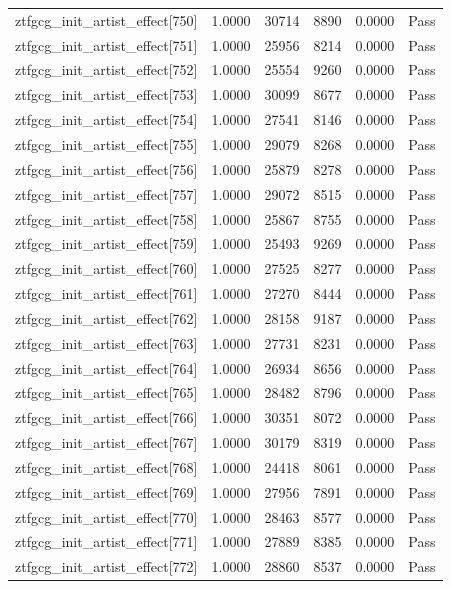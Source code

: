 \begin{table}[htbp]
\begin{tabular}{llrrll}
ztfgcg\_init\_artist\_effect[750] & 1.0000 & 30714 & 8890 & 0.0000 & Pass \\
ztfgcg\_init\_artist\_effect[751] & 1.0000 & 25956 & 8214 & 0.0000 & Pass \\
ztfgcg\_init\_artist\_effect[752] & 1.0000 & 25554 & 9260 & 0.0000 & Pass \\
ztfgcg\_init\_artist\_effect[753] & 1.0000 & 30099 & 8677 & 0.0000 & Pass \\
ztfgcg\_init\_artist\_effect[754] & 1.0000 & 27541 & 8146 & 0.0000 & Pass \\
ztfgcg\_init\_artist\_effect[755] & 1.0000 & 29079 & 8268 & 0.0000 & Pass \\
ztfgcg\_init\_artist\_effect[756] & 1.0000 & 25879 & 8278 & 0.0000 & Pass \\
ztfgcg\_init\_artist\_effect[757] & 1.0000 & 29072 & 8515 & 0.0000 & Pass \\
ztfgcg\_init\_artist\_effect[758] & 1.0000 & 25867 & 8755 & 0.0000 & Pass \\
ztfgcg\_init\_artist\_effect[759] & 1.0000 & 25493 & 9269 & 0.0000 & Pass \\
ztfgcg\_init\_artist\_effect[760] & 1.0000 & 27525 & 8277 & 0.0000 & Pass \\
ztfgcg\_init\_artist\_effect[761] & 1.0000 & 27270 & 8444 & 0.0000 & Pass \\
ztfgcg\_init\_artist\_effect[762] & 1.0000 & 28158 & 9187 & 0.0000 & Pass \\
ztfgcg\_init\_artist\_effect[763] & 1.0000 & 27731 & 8231 & 0.0000 & Pass \\
ztfgcg\_init\_artist\_effect[764] & 1.0000 & 26934 & 8656 & 0.0000 & Pass \\
ztfgcg\_init\_artist\_effect[765] & 1.0000 & 28482 & 8796 & 0.0000 & Pass \\
ztfgcg\_init\_artist\_effect[766] & 1.0000 & 30351 & 8072 & 0.0000 & Pass \\
ztfgcg\_init\_artist\_effect[767] & 1.0000 & 30179 & 8319 & 0.0000 & Pass \\
ztfgcg\_init\_artist\_effect[768] & 1.0000 & 24418 & 8061 & 0.0000 & Pass \\
ztfgcg\_init\_artist\_effect[769] & 1.0000 & 27956 & 7891 & 0.0000 & Pass \\
ztfgcg\_init\_artist\_effect[770] & 1.0000 & 28463 & 8577 & 0.0000 & Pass \\
ztfgcg\_init\_artist\_effect[771] & 1.0000 & 27889 & 8385 & 0.0000 & Pass \\
ztfgcg\_init\_artist\_effect[772] & 1.0000 & 28860 & 8537 & 0.0000 & Pass \\

\end{tabular}
\end{table}

